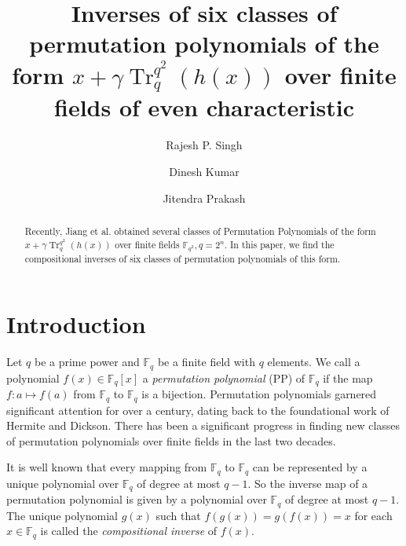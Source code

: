\documentclass{birkjour}
\theoremstyle{definition}
\theoremstyle{remark}
\numberwithin{equation}{section}
\begin{document}
		\title[]{Inverses of six classes of permutation polynomials of the form $x+\gamma\operatorname{Tr}_q^{q^2}(h(x))$ over finite fields of even characteristic} 
	\author[Rajesh P. Singh]{Rajesh P. Singh}
	\address{Department of Mathematics\\ Central University of South Bihar, Gaya, India}
	
	\author[Dinesh Kumar]{Dinesh Kumar}
	\address{Department of Mathematics\\ Central University of South Bihar, Gaya, India}
	\author[Jitendra Prakash]{Jitendra Prakash}
	\address{Department of Mathematics\\ Central University of South Bihar, Gaya, India}
	
	
	
	\begin{abstract}
	Recently, Jiang et al. \cite{JIANG2025102522} obtained several classes of Permutation Polynomials of the form $x+\gamma\operatorname{Tr}_q^{q^2}(h(x))$ over finite fields $\mathbb{F}_{q^2},q=2^n$. In this paper, we find the compositional inverses of six classes of permutation polynomials of this form. 
	\end{abstract}
	
	
	\maketitle

	\section{Introduction}
	Let \( q \) be a prime power and $\mathbb{F}_q$ be a finite field with $q$ elements. We call a polynomial  $f(x) \in \mathbb{F}_q[x]$ a \textit{permutation polynomial} (PP) of \( \mathbb{F}_q \) if the map \( f : a \mapsto f(a) \) from $\mathbb{F}_q$ to $\mathbb{F}_q$ is a bijection. Permutation polynomials garnered significant attention for over a century, dating back to the foundational work of Hermite and Dickson. There has been a significant progress in finding new classes of permutation polynomials over finite fields in the last two decades.
	
	
	It is well known that every mapping from $\mathbb{F}_{q}$ to $\mathbb{F}_{q}$ can be represented by a unique polynomial over $\mathbb{F}_{q}$ of degree at most
	$q-1$. So the inverse map of a permutation polynomial is given by a  polynomial over $\mathbb{F}_{q}$ of degree at most $q-1$. The unique polynomial $g(x)$ such that $f(g(x))=g(f(x))=x$ for each $x \in \mathbb{F}_{q}$ is called the \textit{compositional inverse} of $f(x)$. 
	
\end{document}
